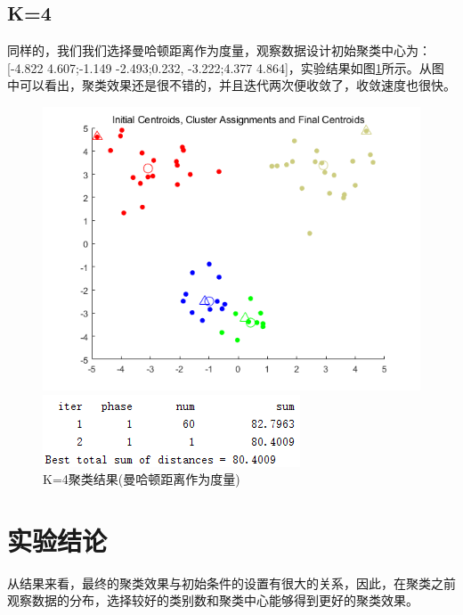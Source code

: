 \documentclass[cn]{elegantbook}
\begin{document}
\subsection{K=4}
同样的，我们我们选择曼哈顿距离作为度量，观察数据设计初始聚类中心为：[-4.822 4.607;-1.149 -2.493;0.232, -3.222;4.377 4.864]，实验结果如图\ref{res41}所示。从图中可以看出，聚类效果还是很不错的，并且迭代两次便收敛了，收敛速度也很快。
\begin{figure}[!h]
	\centering
	\begin{minipage}{0.48\linewidth}
		\centering
		\includegraphics[width=\linewidth]{images/res41}
	\end{minipage}
	\begin{minipage}{0.48\linewidth}
		\centering
		\includegraphics[width=\linewidth]{images/res42}
	\end{minipage}
	\caption{\label{res41}K=4聚类结果(曼哈顿距离作为度量)}
\end{figure}

\section{实验结论}
从结果来看，最终的聚类效果与初始条件的设置有很大的关系，因此，在聚类之前观察数据的分布，选择较好的类别数和聚类中心能够得到更好的聚类效果。
\end{document}
